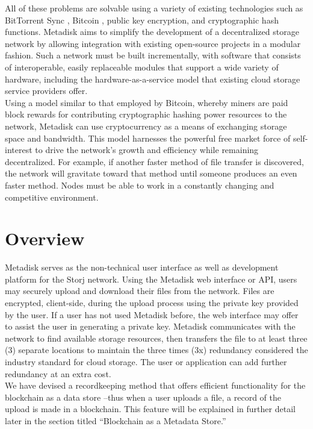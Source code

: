 \documentclass[a4paper,12pt]{article}
\begin{document}
All of these problems are solvable using a variety of existing technologies such as BitTorrent Sync \cite{3}, Bitcoin \cite{4}, public key encryption, and cryptographic hash functions.  Metadisk aims to simplify the development of a decentralized storage network by allowing integration with existing open-source projects in a modular fashion.  Such a network must be built incrementally, with software that consists of interoperable, easily replaceable modules that support a wide variety of hardware, including the hardware-as-a-service model that existing cloud storage service providers offer. \\

Using a model similar to that employed by Bitcoin, whereby miners are paid block rewards for contributing cryptographic hashing power resources to the network, Metadisk can use  cryptocurrency as a means of exchanging storage space and bandwidth. This model harnesses the powerful free market force of self-interest to drive the network’s growth and efficiency while remaining decentralized.  For example, if another faster method of file transfer is discovered, the network will gravitate toward that method until someone produces an even faster method. Nodes must be able to work in a constantly changing and competitive environment.  


\section*{Overview}

Metadisk serves as the non-technical user interface as well as development platform for the Storj network. Using the Metadisk web interface or API, users may securely upload and download their files from the network. Files are encrypted, client-side, during the upload process using the private key provided by the user.  If a user has not used Metadisk before, the web interface may offer to assist the user in generating a private key. Metadisk communicates with the network to find available storage resources, then transfers the file to at least three (3) separate locations to maintain the three times (3x) redundancy considered the industry standard for cloud storage. The user or application can add further redundancy at an extra cost. \\

We have devised a recordkeeping method that offers efficient functionality for the blockchain as a data store --thus when a user uploads a file, a record of the upload is made in a blockchain. This feature will be explained in further detail later in the section titled “Blockchain as a Metadata Store.”\\
\end{document}
